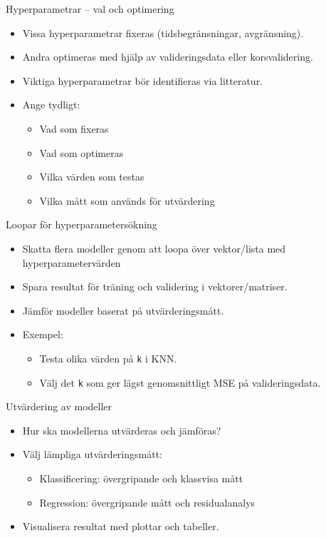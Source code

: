 \documentclass[10pt,english]{beamer}
\begin{document}
\begin{frame}{Hyperparametrar – val och optimering}
\begin{itemize}
    \item Vissa hyperparametrar fixeras (tidsbegränsningar, avgränsning).
    \item Andra optimeras med hjälp av valideringsdata eller korsvalidering.
    \item Viktiga hyperparametrar bör identifieras via litteratur.
    \item Ange tydligt:
    \begin{itemize}
        \item Vad som fixeras
        \item Vad som optimeras
        \item Vilka värden som testas
        \item Vilka mått som används för utvärdering
    \end{itemize}
\end{itemize}
\end{frame}


\begin{frame}{Loopar för hyperparametersökning}
\begin{itemize}
    \item Skatta flera modeller genom att loopa över vektor/lista med hyperparametervärden
    \item Spara resultat för träning och validering i vektorer/matriser.
    \item Jämför modeller baserat på utvärderingsmått.
    \item Exempel:
    \begin{itemize}
        \item Testa olika värden på \texttt{k} i KNN.
        \item Välj det \texttt{k} som ger lägst genomsnittligt MSE på valideringsdata.
    \end{itemize}
\end{itemize}
\end{frame}


\begin{frame}{Utvärdering av modeller}
\begin{itemize}
    \item Hur ska modellerna utvärderas och jämföras?
    \item Välj lämpliga utvärderingsmått:
    \begin{itemize}
        \item Klassificering: övergripande och klassvisa mått
        \item Regression: övergripande mått och residualanalys
    \end{itemize}
    \item Visualisera resultat med plottar och tabeller.
\end{itemize}
\end{frame}
\end{document}
